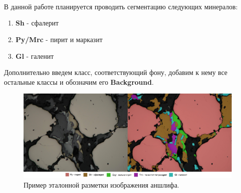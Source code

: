 \\ \\ \\
\par
В данной работе планируется проводить сегментацию следующих минералов:
\begin{enumerate}[nosep]
    \item \textbf{Sh} - сфалерит
    \item \textbf{Py/Mrc} - пирит и марказит
    \item \textbf{Gl} - галенит
\end{enumerate}
Дополнительно введем класс, соответствующий фону, добавим к нему все остальные классы и обозначим его \textbf{Background}.
\newline
\begin{figure}[H]
    \includegraphics[width=\textwidth]{pics/segm_ex2.jpg}
    \centering
    \caption{Пример эталонной разметки изображения аншлифа.}
\end{figure}

\newpage
